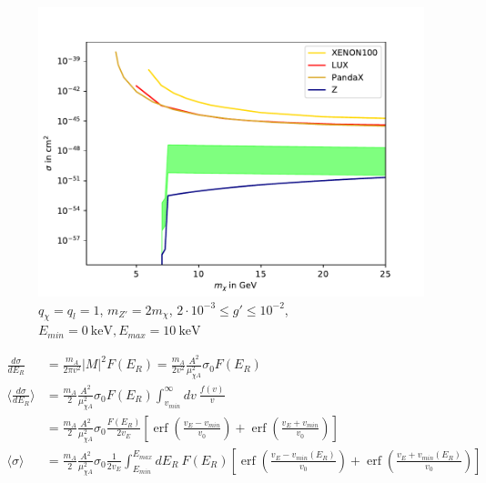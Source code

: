 \documentclass[a4,11pt]{article}
\DeclareMathOperator\erf{erf}
\begin{document}
\clearpage
\begin{figure}[h]
	\centering
	\includegraphics[width=.75\textwidth]{CrossSection.pdf}
	\caption{$q_\chi = q_l = 1$, $m_{Z'} = 2m_\chi$, $2\cdot10^{-3}\leq g'\leq10^{-2}$, $E_{min} = \SI{0}{\kilo\electronvolt}, E_{max} = \SI{10}{\kilo\electronvolt}$}
\end{figure}
\begin{align*}
	\frac{d\sigma}{dE_R} &= \frac{m_A}{2\pi v^2}|M|^2F(E_R) = \frac{m_A}{2v^2}\frac{A^2}{\mu_{\chi A}^2}\sigma_0 F(E_R) \\
	\langle\frac{d\sigma}{dE_R}\rangle &= \frac{m_A}{2}\frac{A^2}{\mu_{\chi A}^2}\sigma_0 F(E_R)\int_{v_{min}}^{\infty}dv\ \frac{f(v)}{v} \\
	&= \frac{m_A}{2}\frac{A^2}{\mu_{\chi A}^2}\sigma_0 \frac{F(E_R)}{2v_E}\left[\erf{\left(\frac{v_E-v_{min}}{v_0}\right)}+\erf{\left(\frac{v_E+v_{min}}{v_0}\right)}\right] \\
	\langle\sigma\rangle &= \frac{m_A}{2}\frac{A^2}{\mu_{\chi A}^2}\sigma_0 \frac{1}{2v_E}\int_{E_{min}}^{E_{max}}dE_R\ F(E_R)\left[\erf{\left(\frac{v_E-v_{min}(E_R)}{v_0}\right)}+\erf{\left(\frac{v_E+v_{min}(E_R)}{v_0}\right)}\right]
\end{align*}
\end{document}
